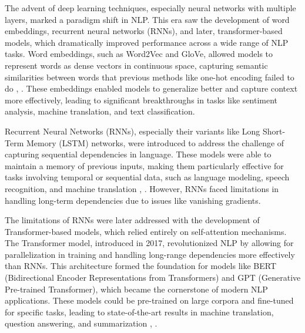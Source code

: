 \begin{enumerate}
    The advent of deep learning techniques, especially neural networks with multiple layers, marked a paradigm shift in NLP. This era saw the development of word embeddings, recurrent neural networks (RNNs), and later, transformer-based models, which dramatically improved performance across a wide range of NLP tasks. Word embeddings, such as Word2Vec and GloVe, allowed models to represent words as dense vectors in continuous space, capturing semantic similarities between words that previous methods like one-hot encoding failed to do \cite{lauriola2022introduction}, \cite{henderson2020unstoppable}. These embeddings enabled models to generalize better and capture context more effectively, leading to significant breakthroughs in tasks like sentiment analysis, machine translation, and text classification.

Recurrent Neural Networks (RNNs), especially their variants like Long Short-Term Memory (LSTM) networks, were introduced to address the challenge of capturing sequential dependencies in language. These models were able to maintain a memory of previous inputs, making them particularly effective for tasks involving temporal or sequential data, such as language modeling, speech recognition, and machine translation \cite{peng2022survey}, \cite{lauriola2022introduction}. However, RNNs faced limitations in handling long-term dependencies due to issues like vanishing gradients.

The limitations of RNNs were later addressed with the development of Transformer-based models, which relied entirely on self-attention mechanisms. The Transformer model, introduced in 2017, revolutionized NLP by allowing for parallelization in training and handling long-range dependencies more effectively than RNNs. This architecture formed the foundation for models like BERT (Bidirectional Encoder Representations from Transformers) and GPT (Generative Pre-trained Transformer), which became the cornerstone of modern NLP applications. These models could be pre-trained on large corpora and fine-tuned for specific tasks, leading to state-of-the-art results in machine translation, question answering, and summarization \cite{lauriola2022introduction}, \cite{henderson2020unstoppable}.
\end{enumerate}

